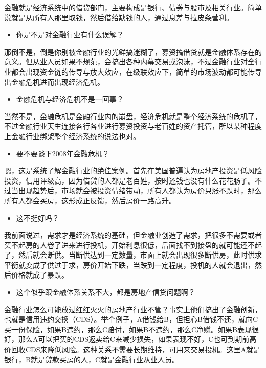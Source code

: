 \documentclass[
  letterpaper,
  DIV=11,
  numbers=noendperiod]{scrreprt}
\providecommand{\tightlist}{%
  \setlength{\itemsep}{0pt}\setlength{\parskip}{0pt}}\usepackage{longtable,booktabs,array}
\begin{document}
金融就是经济系统中的借贷部门，主要构成是银行、债券与股市及相关行业。简单说就是从所有人那里取钱，然后借给缺钱的人，通过息差与拉皮条营利。

\begin{itemize}
\tightlist
\item
  你是不是对金融行业有什么误解？
\end{itemize}

那倒不是，倒是你别被金融行业的光鲜搞迷糊了，募资搞借贷就是金融体系存在的意义。但从业人员如果不规范，会搞出各种内幕交易或泡沫，不过金融行业对全行业都会出现资金链的传导与放大效应，在级联效应下，简单的市场波动都可能传导出金融危机进而出现经济危机。

\begin{itemize}
\tightlist
\item
  金融危机与经济危机不是一回事？
\end{itemize}

当然不是，金融危机是金融行业内的崩盘，经济危机就是整个经济系统的危机了，不过金融行业天生连接各行各业进行募资投资与老百姓的资产托管，所以某种程度上金融行业绑架整个经济系统的说法也对。

\begin{itemize}
\tightlist
\item
  要不要谈下2008年金融危机？
\end{itemize}

嗯，这是系统了解金融行业的绝佳案例。首先在美国普遍认为房地产投资是低风险投资，信用评级高，因为借贷的人都是老百姓，按时还钱也没有什么花花肠子。不过当出现趋势后，市场就会被投资情绪带动，所有人都认为房价只涨不跌时，那么所有人都会买房，这形成正反馈，然后房价一路高升。

\begin{itemize}
\tightlist
\item
  这不挺好吗？
\end{itemize}

我前面说过，需求才是经济系统的基础，但金融业创造了需求，把很多不需要或者买不起房的人卷了进来进行投机，开始利息很低，后面找不到接盘的就可能还不起了，然后就会断供。当断供达到一定数量，市面上就会出现很多断供房，此时供求平衡就变成了供过于求，房价开始下跌，当跌到一定程度，投机的人就会退出，然后价格就成了暴跌。

\begin{itemize}
\tightlist
\item
  这个似乎跟金融体系关系不大，都是房地产信贷问题啊？
\end{itemize}

金融行业怎么可能放过红红火火的房地产行业不管？事实上他们搞出了金融创新，也就是信用违约交换（CDS）。举个例子，A借钱给B，但担心B借钱不还，就向C买一份保险，如果B违约，那么C赔付，如果B不违约，那么C净赚。如果B表现很好，那么A可以把买的CDS返卖给C来减少损失，如果表现不好，C也可到期前高价回收CDS来降低风险。这种关系不需要长期维持，可用来交易投机。这里A就是银行，B就是贷款买房的人，C就是金融行业从业人员。
\end{document}
